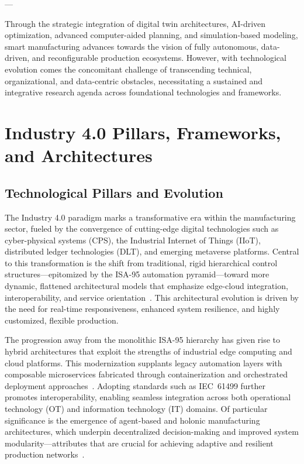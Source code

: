 \documentclass[11pt]{article}
\begin{document}
---

Through the strategic integration of digital twin architectures, AI-driven optimization, advanced computer-aided planning, and simulation-based modeling, smart manufacturing advances towards the vision of fully autonomous, data-driven, and reconfigurable production ecosystems. However, with technological evolution comes the concomitant challenge of transcending technical, organizational, and data-centric obstacles, necessitating a sustained and integrative research agenda across foundational technologies and frameworks.

\section{Industry 4.0 Pillars, Frameworks, and Architectures}

\subsection{Technological Pillars and Evolution}

The Industry 4.0 paradigm marks a transformative era within the manufacturing sector, fueled by the convergence of cutting-edge digital technologies such as cyber-physical systems (CPS), the Industrial Internet of Things (IIoT), distributed ledger technologies (DLT), and emerging metaverse platforms. Central to this transformation is the shift from traditional, rigid hierarchical control structures—epitomized by the ISA-95 automation pyramid—toward more dynamic, flattened architectural models that emphasize edge-cloud integration, interoperability, and service orientation~\cite{ref1,ref9,ref11,ref16,ref18,ref27,ref30,ref37,ref38,ref44,ref45,ref57,ref59}. This architectural evolution is driven by the need for real-time responsiveness, enhanced system resilience, and highly customized, flexible production.

The progression away from the monolithic ISA-95 hierarchy has given rise to hybrid architectures that exploit the strengths of industrial edge computing and cloud platforms. This modernization supplants legacy automation layers with composable microservices fabricated through containerization and orchestrated deployment approaches~\cite{ref1}. Adopting standards such as IEC~61499 further promotes interoperability, enabling seamless integration across both operational technology (OT) and information technology (IT) domains. Of particular significance is the emergence of agent-based and holonic manufacturing architectures, which underpin decentralized decision-making and improved system modularity—attributes that are crucial for achieving adaptive and resilient production networks~\cite{ref11,ref37}.
\end{document}
